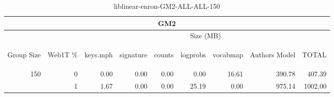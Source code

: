 \begin{center}
\begin{table}[htbp] 
 \begin{center}
\begin{tabular}{ | r | r | r | r | r | r | r | r | r |}
\hline
\multicolumn{9}{|c|}{GM2}\\
\hline
 & & \multicolumn{7}{|c|}{Size (MB)}\\ \cline{3-9}
\begin{sideways}Group Size\end{sideways} & \begin{sideways}Web1T \% \end{sideways} & \begin{sideways}keys.mph\end{sideways} & \begin{sideways}signature\end{sideways} & \begin{sideways}counts\end{sideways} & \begin{sideways}logprobs\end{sideways} & \begin{sideways}vocabmap\end{sideways} & \begin{sideways}Authors Model \end{sideways} & \begin{sideways}TOTAL\end{sideways}\\
\hline
\multirow{1}{*}{150}
 & 0 & 0.00 & 0.00 & 0.00 & 0.00 & 16.61 & 390.78 & 407.39\\ \cline{2-9}
 & 1 & 1.67 & 0.00 & 0.00 & 25.19 & 0.00 & 975.14 & 1002.00\\ \cline{2-9}
\hline
\end{tabular}
\caption{liblinear-enron-GM2-ALL-ALL-150}
\label{table:liblinear-enron-GM2-ALL-ALL-150}
\end{center}
 \end{table}
\end{center}

